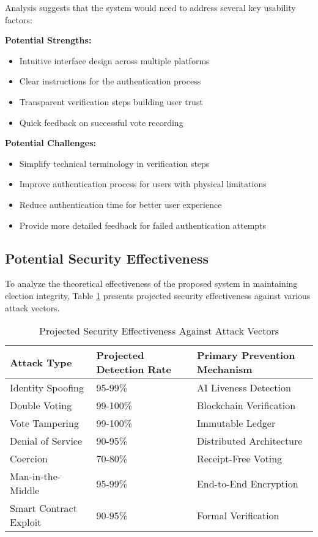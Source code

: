 \documentclass[conference]{IEEEtran}
\begin{document}
Analysis suggests that the system would need to address several key usability factors:

\textbf{Potential Strengths:}
\begin{itemize}
    \item Intuitive interface design across multiple platforms
    \item Clear instructions for the authentication process
    \item Transparent verification steps building user trust
    \item Quick feedback on successful vote recording
\end{itemize}

\textbf{Potential Challenges:}
\begin{itemize}
    \item Simplify technical terminology in verification steps
    \item Improve authentication process for users with physical limitations
    \item Reduce authentication time for better user experience
    \item Provide more detailed feedback for failed authentication attempts
\end{itemize}

\subsection{Potential Security Effectiveness}
To analyze the theoretical effectiveness of the proposed system in maintaining election integrity, Table \ref{tab:attacks} presents projected security effectiveness against various attack vectors.

\begin{table}[!h]
\caption{Projected Security Effectiveness Against Attack Vectors}
\label{tab:attacks}
\centering
\begin{tabular}{|p{2.5cm}|p{2.5cm}|p{3cm}|}
\hline
\textbf{Attack Type} & \textbf{Projected Detection Rate} & \textbf{Primary Prevention Mechanism} \\
\hline
Identity Spoofing & 95-99\% & AI Liveness Detection \\
\hline
Double Voting & 99-100\% & Blockchain Verification \\
\hline
Vote Tampering & 99-100\% & Immutable Ledger \\
\hline
Denial of Service & 90-95\% & Distributed Architecture \\
\hline
Coercion & 70-80\% & Receipt-Free Voting \\
\hline
Man-in-the-Middle & 95-99\% & End-to-End Encryption \\
\hline
Smart Contract Exploit & 90-95\% & Formal Verification \\
\hline
\end{tabular}
\end{table}
\end{document}
